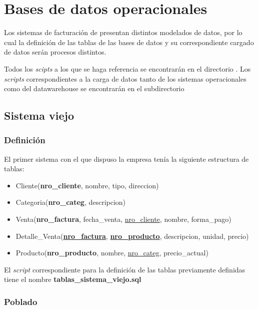 \section{Bases de datos operacionales}

Los sistemas de facturación de  presentan distintos modelados de datos, por lo cual la definición de las tablas de las bases de datos y su correspondiente cargado de datos serán procesos distintos.

Todos los \emph{scipts} a los que se haga referencia se encontrarán en el directorio \textbf{}. Los \emph{scripts} correspondientes a la carga de datos tanto de los sistemas operacionales como del datawarehouse se encontrarán en el subdirectorio \textbf{}   

\subsection{Sistema viejo}

\subsubsection{Definición}

El primer sistema con el que dispuso la empresa tenía la siguiente estructura de tablas:

\begin{itemize}
    \item Cliente(\textbf{nro\_cliente}, nombre, tipo, direccion)
    \item Categoria(\textbf{nro\_categ}, descripcion)
    \item Venta(\textbf{nro\_factura}, fecha\_venta, \underline{nro\_cliente}, nombre, forma\_pago)
    \item Detalle\_Venta(\underline{\textbf{nro\_factura}}, \underline{\textbf{nro\_producto}}, descripcion, unidad, precio)
    \item Producto(\textbf{nro\_producto}, nombre, \underline{nro\_categ}, precio\_actual)
\end{itemize}

El \emph{script} correspondiente para la definición de las tablas previamente definidas tiene el nombre \textbf{tablas\_sistema\_viejo.sql} 

\subsubsection{Poblado}

